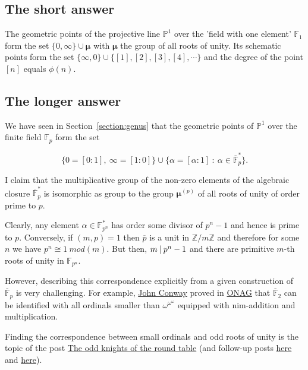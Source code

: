 \label{section:what-is-p1}
\subsection{The short answer}
The geometric points of the projective line $\mathbb{P}^1$ over the 'field with one element' $\mathbb{F}_1$ form the set $\{ 0,\infty \} \cup \pmb{\mu}$ with $\pmb{\mu}$ the group of all roots of unity. Its schematic points form the set $\{ \infty,0 \} \cup \{ [1],[2],[3],[4],\cdots \}$ and the degree of the point $[n]$ equals $\phi(n)$.

\subsection{The longer answer}
We have seen in Section~\ref{section:genus} that the geometric points of $\mathbb{P}^1$ over the finite field $\mathbb{F}_p$ form the set

\begin{equation}
  \{ 0 = [0:1],~\infty=[1:0] \} \cup \{ \alpha = [\alpha:1]~:~\alpha \in \overline{\mathbb{F}}_p^{\ast} \}.
\end{equation}

I claim that the multiplicative group of the non-zero elements of the algebraic closure $\overline{\mathbb{F}}_p^{\ast}$ is isomorphic as group to the group $\pmb{\mu}^{(p)}$ of all roots of unity of order prime to $p$.

Clearly, any element $\alpha \in \mathbb{F}^{\ast}_{p^n}$   has order some divisor of $p^n-1$ and hence is prime to $p$. Conversely, if $(m,p)=1$ then $\overline{p}$ is a unit in $\mathbb{Z}/m\mathbb{Z}$ and therefore for some $n$ we have $p^n \cong 1~mod(m)$. But then, $m\mathbin{|} p^n-1$ and there are primitive $m$-th roots of unity in $\mathbb{F}_{p^n}$.

However, describing this correspondence explicitly from a given construction of $\overline{\mathbb{F}}_p$ is very challenging. For example, \href{http://en.wikipedia.org/wiki/John_Horton_Conway}{John Conway} proved in \href{http://en.wikipedia.org/wiki/On_Numbers_and_Games}{ONAG} that $\overline{\mathbb{F}}_2$ can be identified with all ordinals smaller than $\omega^{\omega^{\omega}}$ equipped with nim-addition and multiplication.

Finding the correspondence between small ordinals and odd roots of unity is the topic of the post \href{http://www.neverendingbooks.org/index.php/the-odd-knights-of-the-round-table.html}{The odd knights of the round table} (and follow-up posts \href{http://www.neverendingbooks.org/index.php/seating-the-first-few-thousand-knights.html}{here} and \href{http://www.neverendingbooks.org/index.php/seating-the-first-few-billion-knights.html}{here}).

